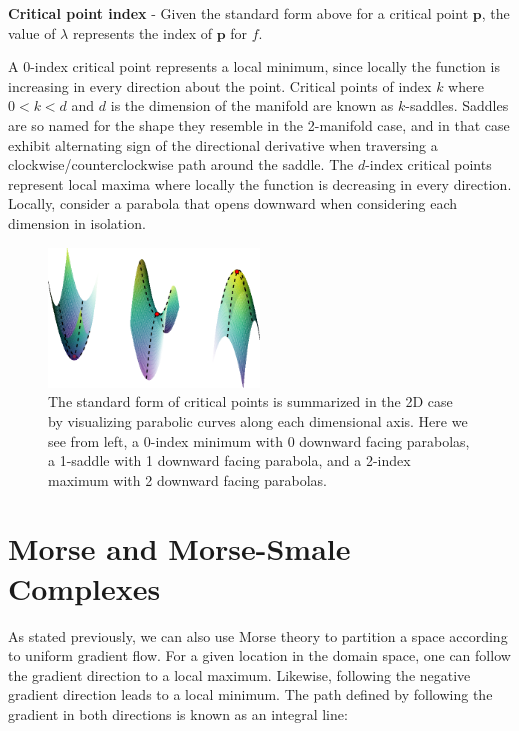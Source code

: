 \begin{defn}
\textbf{Critical point index} - Given the standard form above for a critical point $\mathbf{p}$, the value of $\lambda$ represents the index of $\mathbf{p}$ for $f$.
\end{defn}

A 0-index critical point represents a local minimum, since locally the function is increasing in every direction about the point. Critical points of index $k$ where $0 < k < d$ and $d$ is the dimension of the manifold are known as $k$-saddles.
%
Saddles are so named for the shape they resemble in the 2-manifold case, and in that case exhibit alternating sign of the directional derivative when traversing a clockwise/counterclockwise path around the saddle.
%
The $d$-index critical points represent local maxima where locally the function is decreasing in every direction. Locally, consider a parabola that opens downward when considering each dimension in isolation.

\begin{figure}[!ht]
  \centering
  \includegraphics[width=0.5\textwidth]{figs/chap4/criticalPoints}
  \caption[Critical Points of Varying Index]{The standard form of critical points is summarized in the 2D case by visualizing parabolic curves along each dimensional axis. Here we see from left, a 0-index minimum with 0 downward facing parabolas, a 1-saddle with 1 downward facing parabola, and a 2-index maximum with 2 downward facing parabolas.}
  \label{fig:critical_points}
\end{figure}

\section{Morse and Morse-Smale Complexes}

As stated previously, we can also use Morse theory to partition a space according to uniform gradient flow.
%
For a given location in the domain space, one can follow the gradient direction to a local maximum.
%
Likewise, following the negative gradient direction leads to a local minimum.
%
The path defined by following the gradient in both directions is known as an integral line:

